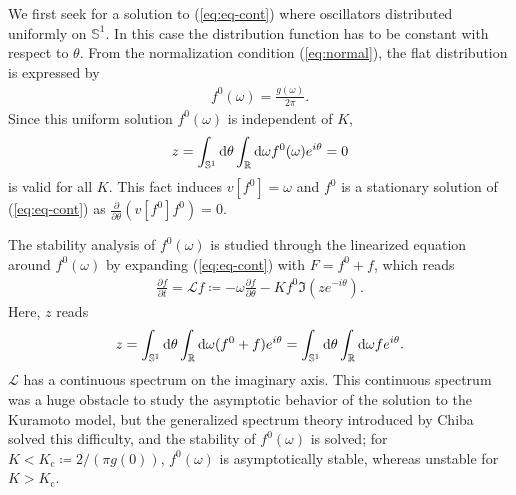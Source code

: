 We first seek for a solution to (\ref{eq:eq-cont})
where oscillators distributed uniformly on $\mathbb{S}^{1}$.
In this case the distribution function has to be constant with respect to $\theta$.
From the normalization condition (\ref{eq:normal}),
the flat distribution is expressed by
\begin{align}
  f^{0}(\omega)=\frac{g(\omega)}{2\pi}.
\end{align}
Since this uniform solution $f^{0}(\omega)$ is independent of $K$,
\begin{align}
  z=\int_{\mathbb{S}^{1}}\mathrm{d}\theta\int_{\mathbb{R}}\mathrm{d}\omega f^{0}(\omega)e^{i\theta}=0  
\end{align}
is valid for all $K$.
This fact induces $v[f^{0}]=\omega$
and $f^{0}$ is a stationary solution of (\ref{eq:eq-cont})
as $\frac{\partial}{\partial\theta}(v[f^{0}]f^{0})=0$.

The stability analysis of $f^{0}(\omega)$ is studied
through the linearized equation around $f^{0}(\omega)$
by expanding (\ref{eq:eq-cont}) with $F=f^{0}+f$, which reads
\begin{align}
  \frac{\partial f}{\partial t}=\mathcal{L}f\coloneqq-\omega\frac{\partial f}{\partial\theta}-Kf^{0}\Im(ze^{-i\theta}).
\end{align}
Here, $z$ reads
\begin{align}
  z=\int_{\mathbb{S}^{1}}\mathrm{d}\theta\int_{\mathbb{R}}\mathrm{d}\omega(f^{0}+f)e^{i\theta}=\int_{\mathbb{S}^{1}}\mathrm{d}\theta\int_{\mathbb{R}}\mathrm{d}\omega fe^{i\theta}.
\end{align}
$\mathcal{L}$ has a continuous spectrum on the imaginary axis.
This continuous spectrum was a huge obstacle to study the asymptotic behavior of the solution to the Kuramoto model,
but the generalized spectrum theory introduced by Chiba~\cite{chiba2015} solved this difficulty,
and the stability of $f^{0}(\omega)$ is solved;
for $K<K_{\mathrm{c}}\coloneqq2/(\pi g(0))$, $f^{0}(\omega)$ is asymptotically stable,
whereas unstable for $K>K_{\mathrm{c}}$.

